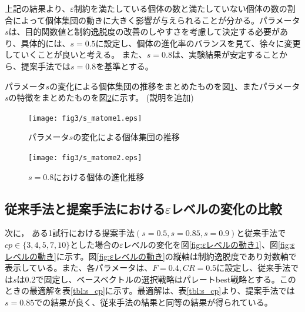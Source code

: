 \documentclass[a4paper,12pt]{jsreport}
\begin{document}
上記の結果より、$\varepsilon$制約を満たしている個体の数と満たしていない個体の数の割合によって個体集団の動きに大きく影響が与えられることが分かる。パラメータ$s$は、目的関数値と制約逸脱度の改善のしやすさを考慮して決定する必要があり、具体的には、$s=0.5$に設定し、個体の進化率のバランスを見て、徐々に変更していくことが良いと考える。
また、$s=0.8$は、実験結果が安定することから、提案手法では$s=0.8$を基準とする。


パラメータ$s$の変化による個体集団の推移をまとめたものを図\ref{fig:s_matome1}、またパラメータ$s$の特徴をまとめたものを図\ref{fig:s_matome2}に示す。 (説明を追加)



\begin{figure}[htbp]
  \centering
  \texttt{[image: fig3/s\_matome1.eps]}
  \caption{パラメータ$s$の変化による個体集団の推移}
  \label{fig:s_matome1}
\end{figure}


\begin{figure}[htbp]
  \centering
  \texttt{[image: fig3/s\_matome2.eps]}
  \caption{$s=0.8$における個体の進化推移}
  \label{fig:s_matome2}
\end{figure}

\newpage

\subsection{従来手法と提案手法における$\varepsilon$レベルの変化の比較}

次に，
ある1試行における提案手法$(s=0.5,s=0.85,s=0.9)$と従来手法で$cp \in  \{3,4,5,7,10 \} $とした場合の$\varepsilon$レベルの変化を図\ref{fig:εレベルの動き1}、図\ref{fig:εレベルの動き}に示す。図\ref{fig:εレベルの動き}の縦軸は制約逸脱度であり対数軸で表示している。また、各パラメータは、$F=0.4,CR=0.5$に設定し、従来手法では$s$は$0.2$で固定し、ベースベクトルの選択戦略はパレートbest戦略とする。このときの最適解を表\ref{tbl:s_cp}に示す。最適解は、表\ref{tbl:s_cp}より、提案手法では$s=0.85$での結果が良く、従来手法の結果と同等の結果が得られている。
\end{document}
